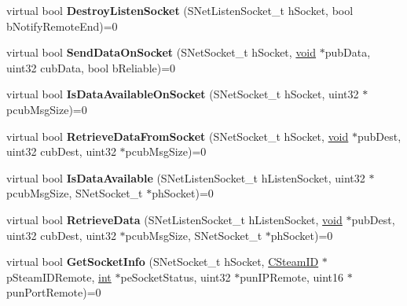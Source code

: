 \begin{DoxyCompactItemize}
\item 
\hypertarget{classISteamNetworking_ade35fbe2b04ff79e7ad536d8a7c4f2d3}{}virtual bool {\bfseries Destroy\+Listen\+Socket} (S\+Net\+Listen\+Socket\+\_\+t h\+Socket, bool b\+Notify\+Remote\+End)=0\label{classISteamNetworking_ade35fbe2b04ff79e7ad536d8a7c4f2d3}

\item 
\hypertarget{classISteamNetworking_a88151472eeed9395e0352eaa198375e9}{}virtual bool {\bfseries Send\+Data\+On\+Socket} (S\+Net\+Socket\+\_\+t h\+Socket, \hyperlink{SDL__audio_8h_a52835ae37c4bb905b903cbaf5d04b05f}{void} $\ast$pub\+Data, uint32 cub\+Data, bool b\+Reliable)=0\label{classISteamNetworking_a88151472eeed9395e0352eaa198375e9}

\item 
\hypertarget{classISteamNetworking_a3c8584b744d21f9090fa1266da4ee820}{}virtual bool {\bfseries Is\+Data\+Available\+On\+Socket} (S\+Net\+Socket\+\_\+t h\+Socket, uint32 $\ast$pcub\+Msg\+Size)=0\label{classISteamNetworking_a3c8584b744d21f9090fa1266da4ee820}

\item 
\hypertarget{classISteamNetworking_ae1f443372f7f153951e9d0e39c1a643b}{}virtual bool {\bfseries Retrieve\+Data\+From\+Socket} (S\+Net\+Socket\+\_\+t h\+Socket, \hyperlink{SDL__audio_8h_a52835ae37c4bb905b903cbaf5d04b05f}{void} $\ast$pub\+Dest, uint32 cub\+Dest, uint32 $\ast$pcub\+Msg\+Size)=0\label{classISteamNetworking_ae1f443372f7f153951e9d0e39c1a643b}

\item 
\hypertarget{classISteamNetworking_a061e82b63b61aa51169c00c5d2fe21f3}{}virtual bool {\bfseries Is\+Data\+Available} (S\+Net\+Listen\+Socket\+\_\+t h\+Listen\+Socket, uint32 $\ast$pcub\+Msg\+Size, S\+Net\+Socket\+\_\+t $\ast$ph\+Socket)=0\label{classISteamNetworking_a061e82b63b61aa51169c00c5d2fe21f3}

\item 
\hypertarget{classISteamNetworking_aad639c6d6b67bf041650788787108752}{}virtual bool {\bfseries Retrieve\+Data} (S\+Net\+Listen\+Socket\+\_\+t h\+Listen\+Socket, \hyperlink{SDL__audio_8h_a52835ae37c4bb905b903cbaf5d04b05f}{void} $\ast$pub\+Dest, uint32 cub\+Dest, uint32 $\ast$pcub\+Msg\+Size, S\+Net\+Socket\+\_\+t $\ast$ph\+Socket)=0\label{classISteamNetworking_aad639c6d6b67bf041650788787108752}

\item 
\hypertarget{classISteamNetworking_af970cbc561c07dfb36262ebdfd2e40df}{}virtual bool {\bfseries Get\+Socket\+Info} (S\+Net\+Socket\+\_\+t h\+Socket, \hyperlink{classCSteamID}{C\+Steam\+I\+D} $\ast$p\+Steam\+I\+D\+Remote, \hyperlink{SDL__thread_8h_a6a64f9be4433e4de6e2f2f548cf3c08e}{int} $\ast$pe\+Socket\+Status, uint32 $\ast$pun\+I\+P\+Remote, uint16 $\ast$pun\+Port\+Remote)=0\label{classISteamNetworking_af970cbc561c07dfb36262ebdfd2e40df}


\end{DoxyCompactItemize}

